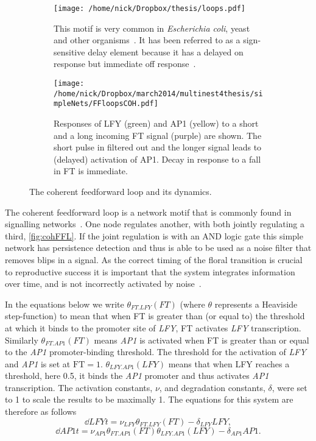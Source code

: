 \begin{figure*}[!htb]
\centering
\begin{subfigure}[b]{0.43\linewidth}
\texttt{[image: /home/nick/Dropbox/thesis/loops.pdf]}
\caption{
This motif is very common in \emph{Escherichia coli}, yeast and other organisms~\cite{mangan2003}.
It has been referred to as a sign-sensitive delay element because it has a delayed on response but immediate off response~\cite{alon2006}.
}
\label{fig:cohFFL}
\end{subfigure}
\begin{subfigure}[b]{0.56\linewidth}
\texttt{[image: /home/nick/Dropbox/march2014/multinest4thesis/simpleNets/FFloopsCOH.pdf]}
\caption{%
Responses of LFY (green) and AP1 (yellow) to a short and a long incoming FT signal (purple) are shown.
The short pulse in filtered out and the longer signal leads to (delayed) activation of AP1.
Decay in response to a fall in FT is immediate.
}
\label{fig:cohFFLdyn}
\end{subfigure}
\captionsetup{justification=centering}
\caption{The coherent feedforward loop and its dynamics.}%
\end{figure*}

The coherent feedforward loop is a network motif that is commonly found in signalling networks~\cite{mangan2003, alon2006}.
One node regulates another, with both jointly regulating a third, \autoref{fig:cohFFL}.
If the joint regulation is with an AND logic gate this simple network has persistence detection and thus is able to be used as a noise filter that removes blips in a signal.
As the correct timing of the floral transition is crucial to reproductive success it is important that the system integrates information over time, and is not incorrectly activated by noise~\cite{hasty2000}.

In the equations below we write $\theta_{FT.LFY} (FT)$ (where $\theta$ represents a Heaviside step-function) to mean that when FT is greater than (or equal to) the threshold at which it binds to the promoter site of \emph{LFY}, FT activates \emph{LFY} transcription.
Similarly $\theta_{FT.AP1} (FT)$ means \emph{AP1} is activated when FT is greater than or equal to the \emph{AP1} promoter-binding threshold.
The threshold for the activation of \emph{LFY} and \emph{AP1} is set at $\mathrm{FT}=1$.
$\theta_{LFY.AP1} (LFY)$ means that when LFY reaches a threshold, here 0.5, it binds the \emph{AP1} promoter and thus activates \emph{AP1} transcription.
The activation constants, $\nu$, and degradation constants, $\delta$, were set to 1 to scale the results to be maximally 1.
The equations for this system are therefore as follows
\begin{equation*}
\dd{LFY}{t} = \nu_{LFY} \theta_{FT.LFY} (FT) -\delta_{LFY} LFY,
\end{equation*}
\begin{equation*}
\dd{AP1}{t} = \nu_{AP1} \theta_{FT.AP1} (FT)\theta_{LFY.AP1} \left(LFY\right) -\delta_{AP1} AP1.
\end{equation*}

